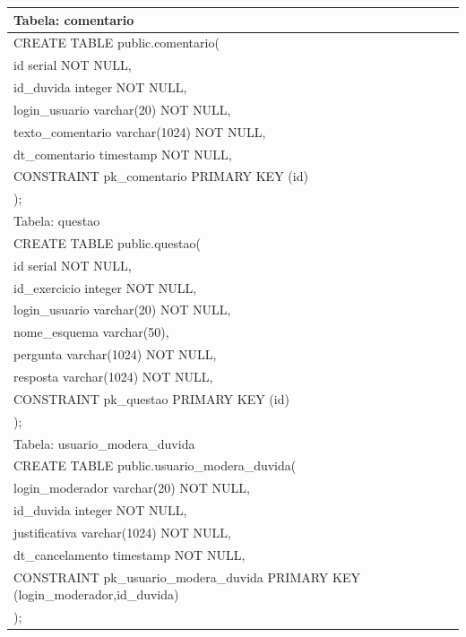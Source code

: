 \documentclass[graduacao,brazil]{ThesisPUC}
\begin{document}
\begin{table}[H]
{\begin{tabular}{|l|}
    Tabela: comentario                                                                                                                                                                                                                                                                 \\ \hline
    CREATE TABLE public.comentario( \\	id serial NOT NULL, \\	id\_duvida integer NOT NULL, \\	login\_usuario varchar(20) NOT NULL, \\	texto\_comentario varchar(1024) NOT NULL, \\	dt\_comentario timestamp NOT NULL, \\	CONSTRAINT pk\_comentario PRIMARY KEY (id) \\);               \\ \hline
    Tabela: questao                                                                                                                                                                                                                                                                    \\ \hline
    CREATE TABLE public.questao( \\	id serial NOT NULL, \\	id\_exercicio integer NOT NULL, \\	login\_usuario varchar(20) NOT NULL, \\	nome\_esquema varchar(50), \\	pergunta varchar(1024) NOT NULL, \\	resposta varchar(1024) NOT NULL, \\	CONSTRAINT pk\_questao PRIMARY KEY (id) \\); \\ \hline
    Tabela: usuario\_modera\_duvida                                                                                                                                                                                                                                                    \\ \hline
    CREATE TABLE public.usuario\_modera\_duvida( \\	login\_moderador varchar(20) NOT NULL, \\	id\_duvida integer NOT NULL, \\	justificativa varchar(1024) NOT NULL, \\	dt\_cancelamento timestamp NOT NULL, \\	CONSTRAINT pk\_usuario\_modera\_duvida PRIMARY KEY (login\_moderador,id\_duvida) \\); \\ \hline

\end{tabular}}
\end{table}
\end{document}
